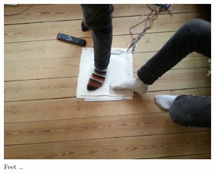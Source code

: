 \begin{figure}[h]
  \centering
  \begin{minipage}[b]{.8\textwidth}
    \centering
    \includegraphics[width=.7\linewidth]{figures/touch/evaluation/sebastian/feet}
  \caption[Feet \dots]
  {Feet \dots}
  \label{fig:textiletouch:eval:sebastian:feet}
  \end{minipage}
\end{figure}

